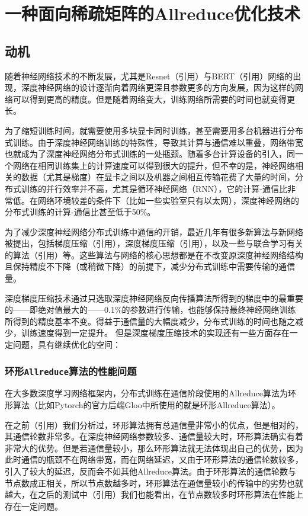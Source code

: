 \chapter{一种面向稀疏矩阵的Allreduce优化技术}
\label{chap3}

\section{动机}

随着神经网络技术的不断发展，尤其是Resnet（引用）与BERT（引用）网络的出现，深度神经网络的设计逐渐向着网络更深且参数更多的方向发展，因为这样的网络可以得到更高的精度。但是随着网络变大，训练网络所需要的时间也就变得更长。

为了缩短训练时间，就需要使用多块显卡同时训练，甚至需要用多台机器进行分布式训练。由于深度神经网络训练的特殊性，导致其计算与通信难以重叠，网络带宽也就成为了深度神经网络分布式训练的一处瓶颈。随着多台计算设备的引入，同一个网络在相同训练集上的计算速度可以得到很大的提升，但不幸的是，神经网络相关的数据（尤其是梯度）在显卡之间以及机器之间相互传输花费了大量的时间，分布式训练的并行效率并不高，尤其是循环神经网络（RNN），它的计算-通信比非常低。在网络环境较差的条件下（比如一些实验室只有以太网），深度神经网络的分布式训练的计算-通信比甚至低于50\%。

为了减少深度神经网络分布式训练中通信的开销，最近几年有很多新算法与新网络被提出，包括梯度压缩（引用），深度梯度压缩（引用），以及一些与联合学习有关的算法（引用）等。这些算法与网络的核心思想都是在不改变原深度神经网络结构且保持精度不下降（或稍微下降）的前提下，减少分布式训练中需要传输的通信量。

深度梯度压缩技术通过只选取深度神经网络反向传播算法所得到的梯度中的最重要的——即绝对值最大的——0.1\%的参数进行传输，也能够保持最终神经网络训练所得到的精度基本不变。得益于通信量的大幅度减少，分布式训练的时间也随之减少，训练速度得到一定提升。
但是深度梯度压缩技术的实现还有一些方面存在一定问题，具有继续优化的空间：

\subsection{环形\texttt{Allreduce}算法的性能问题}
  在大多数深度学习网络框架内，分布式训练在通信阶段使用的Allreduce算法为环形算法（比如Pytorch的官方后端Gloo中所使用的就是环形Allreduce算法）。
  
  在之前（引用）我们分析过，环形算法拥有总通信量非常小的优点，但是相对的，其通信轮数非常多。在深度神经网络参数较多、通信量较大时，环形算法确实有着非常大的优势。但是若通信量较小，那么环形算法就无法体现出自己的优势，因为此时通信的瓶颈不在网络带宽，而在网络延迟，又由于环形算法的通信轮数较多，引入了较大的延迟，反而会不如其他Allreduce算法。由于环形算法的通信轮数与节点数成正相关，所以节点数越多时，环形算法在通信量较小的传输中的劣势也就越大，在之后的测试中（引用）我们也能看出，在节点数较多时环形算法在性能上存在一定问题。
  

